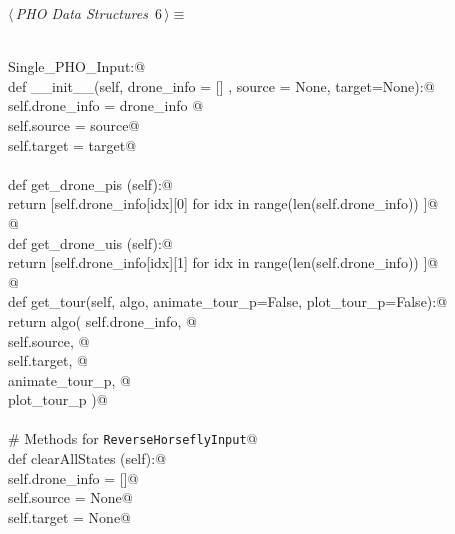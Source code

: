 \documentclass[10.0pt]{report}
\begin{document}
\begin{flushleft} \small\label{scrap1}\raggedright\small
{} $\langle\,${\itshape PHO Data Structures}\nobreak\ {\footnotesize {6}}$\,\rangle\equiv$
\vspace{-1ex}
\begin{list}{}{} \item
\mbox{}\verb@@\\
\mbox{}\verb@class Single_PHO_Input:@\\
\mbox{}\verb@    def __init__(self, drone_info = [] , source = None, target=None):@\\
\mbox{}\verb@           self.drone_info = drone_info @\\
\mbox{}\verb@           self.source     = source@\\
\mbox{}\verb@           self.target     = target@\\
\mbox{}\verb@@\\
\mbox{}\verb@    def get_drone_pis (self):@\\
\mbox{}\verb@           return [self.drone_info[idx][0] for idx in range(len(self.drone_info)) ]@\\
\mbox{}\verb@           @\\
\mbox{}\verb@    def get_drone_uis (self):@\\
\mbox{}\verb@           return [self.drone_info[idx][1] for idx in range(len(self.drone_info)) ]@\\
\mbox{}\verb@         @\\
\mbox{}\verb@    def get_tour(self, algo, animate_tour_p=False, plot_tour_p=False):@\\
\mbox{}\verb@           return algo( self.drone_info, @\\
\mbox{}\verb@                        self.source, @\\
\mbox{}\verb@                        self.target, @\\
\mbox{}\verb@                        animate_tour_p, @\\
\mbox{}\verb@                        plot_tour_p    )@\\
\mbox{}\verb@@\\
\mbox{}\verb@    # Methods for \verb|ReverseHorseflyInput|@\\
\mbox{}\verb@    def clearAllStates (self):@\\
\mbox{}\verb@          self.drone_info = []@\\
\mbox{}\verb@          self.source = None@\\
\mbox{}\verb@          self.target = None@\\

\end{list}
\end{flushleft}
\end{document}
